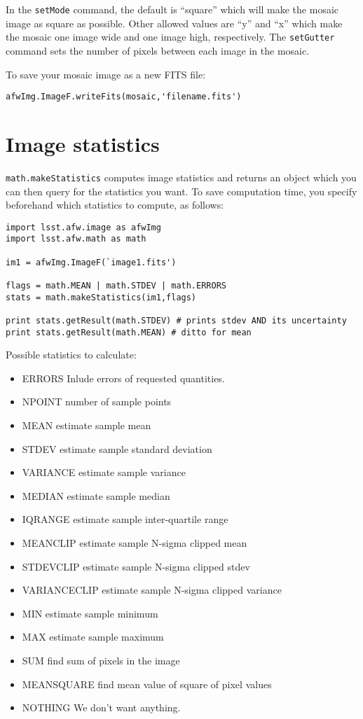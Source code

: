 \documentclass{book}
\begin{document}
In the \texttt{setMode} command, the default is ``square'' which will
make the mosaic image as square as possible.  Other allowed values are
``y'' and ``x'' which make the mosaic one image wide and one image
high, respectively.  The \texttt{setGutter} command sets the number of
pixels between each image in the mosaic.

To save your mosaic image as a new FITS file:

\begin{verbatim}
afwImg.ImageF.writeFits(mosaic,'filename.fits')
\end{verbatim}


\section{Image statistics}

\texttt{math.makeStatistics} computes image statistics and returns an
object which you can then query for the statistics you want.  To save
computation time, you specify beforehand which statistics to compute,
as follows:

\begin{verbatim}
import lsst.afw.image as afwImg
import lsst.afw.math as math

im1 = afwImg.ImageF(`image1.fits')

flags = math.MEAN | math.STDEV | math.ERRORS 
stats = math.makeStatistics(im1,flags)

print stats.getResult(math.STDEV) # prints stdev AND its uncertainty
print stats.getResult(math.MEAN) # ditto for mean

\end{verbatim}

Possible statistics to calculate:
\begin{itemize}
\item ERRORS     Inlude errors of requested quantities.
\item NPOINT     number of sample points
\item MEAN     estimate sample mean
\item STDEV     estimate sample standard deviation
\item VARIANCE     estimate sample variance
\item MEDIAN     estimate sample median
\item IQRANGE     estimate sample inter-quartile range
\item MEANCLIP     estimate sample N-sigma clipped mean
\item STDEVCLIP     estimate sample N-sigma clipped stdev
\item VARIANCECLIP     estimate sample N-sigma clipped variance
\item MIN     estimate sample minimum
\item MAX     estimate sample maximum
\item SUM     find sum of pixels in the image
\item MEANSQUARE     find mean value of square of pixel values
\item NOTHING     We don't want anything.
\end{itemize}
\end{document}
